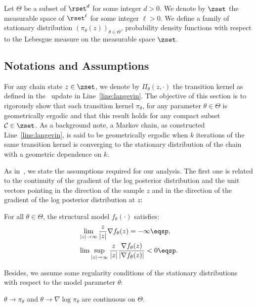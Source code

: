 \documentclass{article} %
\begin{document}
Let $\Theta$ be a subset of $\rset^d$ for some integer $d >0$.
We denote by $\zset$ the measurable space of $\rset^\ell$ for some integer $\ell >0$.
We define a family of stationary distribution $\left(\pi_\theta(z) \right)_{\theta \in \Theta}$, probability density functions with respect to the Lebesgue measure on the measurable space $\zset$. 

\subsection{Notations and Assumptions}
For any chain state $z \in \zset$, we denote by $\Pi_\theta(z,\cdot)$ the transition kernel as defined in the \algo\ update in Line~\ref{line:langevin}.
The objective of this section is to rigorously show that each transition kernel $\pi_\theta$, for any parameter $\theta \in \Theta$ is geometrically ergodic and that this result holds for any compact subset $\mathcal{C} \in \zset$.
As a background note, a Markov chain, as constructed Line~\ref{line:langevin}, is said to be geometrically ergodic when $k$ iterations of the same transition kernel is converging to the stationary distribution of the chain with a geometric dependence on $k$.

As in~\citet{allassonniere2015convergent}, we state the assumptions required for our analysis.
The first one is related to the continuity of the gradient of the log posterior distribution and the unit vectors pointing in the direction of the sample $z$ and in the direction of the gradient of the log posterior distribution at $z$:
\begin{assumption}\label{ass:bounded}
For all $\theta \in \Theta$, the structural model $f_\theta(\cdot)$ satisfies:
\begin{equation}\notag
\begin{split}
&\lim \limits_{|z| \to \infty} \frac{z}{|z|} \nabla f_{\theta}(z)  = - \infty \eqsp,\\
 &\lim \sup \limits_{|z| \to \infty} \frac{z}{|z|} \frac{\nabla f_{\theta}(z) }{|\nabla f_{\theta}(z) |} < 0 \eqsp.
\end{split}
\end{equation}
\end{assumption}

Besides, we assume some regularity conditions of the stationary distributions with respect to the model parameter $\theta$:
\begin{assumption}\label{ass:contlogpi}
$\theta \to \pi_\theta$ and $\theta \to \nabla \log \pi_\theta$ are continuous on $\Theta$.
\end{assumption}
\end{document}
